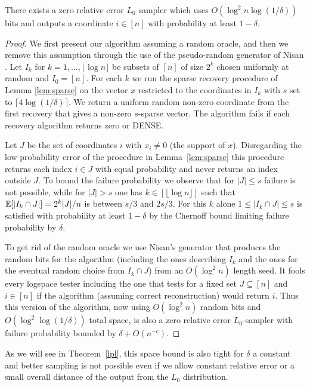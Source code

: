 \begin{theorem}\label{l0}
There exists a zero relative error $L_0$ sampler which
 uses $O(\log^2 n\log(1/\delta))$ bits and outputs a 
 coordinate $i\in[n]$ with probability at least $1-\delta$.
\end{theorem}
\begin{proof} We first present our algorithm assuming a random oracle, and
  then we remove this assumption through the use of the pseudo-random
  generator of Nisan \cite{Nisan}. Let $I_k$ for $k=1,\ldots,\lfloor\log
  n\rfloor$ be subsets of $[n]$ of size $2^k$ chosen uniformly at random and
  $I_0=[n]$. For each
  $k$ we run the sparse recovery procedure of
  Lemma \ref{lem:sparse} on the vector $x$ restricted to the coordinates in
  $I_k$ with $s$ set to $\lceil4\log(1/\delta)\rceil$. We return a uniform
  random non-zero coordinate from the first recovery that gives a non-zero
  $s$-sparse vector. The algorithm fails if each recovery algorithm returns
  zero or DENSE.

  Let $J$ be the set of coordinates $i$ with $x_i\ne0$ (the support of $x$).
  Disregarding the low probability error of the procedure in
  Lemma~\ref{lem:sparse} this procedure returns each index $i\in J$ with equal
  probability and never returns an index outside $J$. To bound the failure
  probability we observe that for $|J|\le s$ failure is not possible, while for
  $|J|>s$ one has $k\in[\lfloor\log n\rfloor]$ such that $\operatorname*{\mathbb{E}}[|I_k\cap
  J|]=2^k|J|/n$ is between $s/3$ and $2s/3$. For this $k$ alone $1\le|I_k\cap
  J|\le s$ is satisfied with probability at least $1-\delta$ by the Chernoff
  bound limiting failure probability by $\delta$.

  To get rid of the random oracle we use Nisan's generator \cite{Nisan} that
  produces the random bits for the algorithm (including the ones describing
  $I_k$ and the ones for the eventual random choice from $I_k\cap J$) from an
  $O(\log^2 n)$ length seed. It fools every logspace tester including the one
  that tests for a fixed set $J\subseteq[n]$ and $i\in[n]$ if the algorithm
  (assuming correct reconstruction) would return $i$. Thus this version of the
  algorithm, now using $O(\log^2n)$ random bits and $O(\log^2\log(1/\delta))$
  total space, is also a zero relative error $L_0$-sampler with failure
  probability bounded by $\delta+O(n^{-c})$.
\end{proof}

As we will see in Theorem~\ref{lpl}, this space bound is also tight for
$\delta$ a constant and better sampling is not possible even if we allow
constant relative error or a small overall distance of the output from the
$L_0$ distribution.
